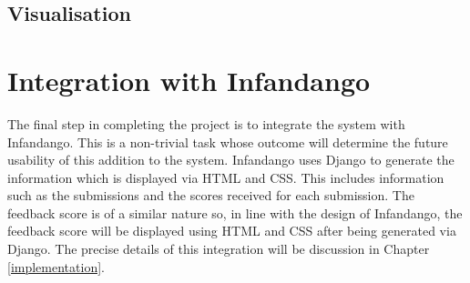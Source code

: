 \subsection{Visualisation}

\section{Integration with Infandango}
The final step in completing the project is to integrate the system with Infandango. This is a non-trivial task whose outcome will determine the future usability of this addition to the system. Infandango uses Django to generate the information which is displayed via HTML and CSS. This includes information such as the submissions and the scores received for each submission. The feedback score is of a similar nature so, in line with the design of Infandango, the feedback score will be displayed using HTML and CSS after being generated via Django. The precise details of this integration will be discussion in Chapter \ref{implementation}.
